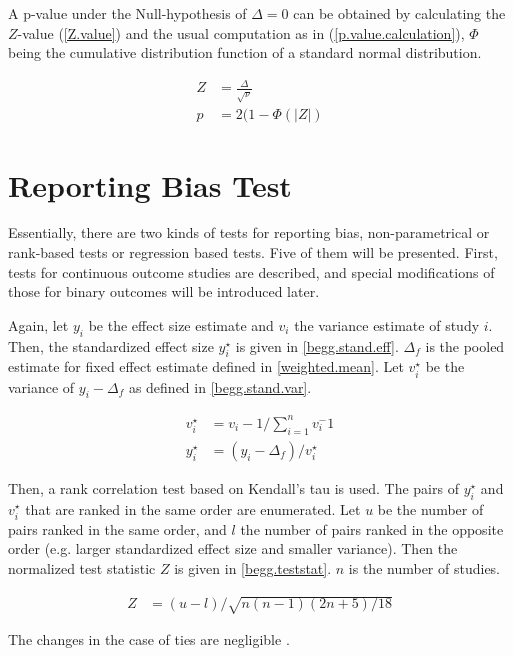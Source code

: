\documentclass[11pt,a4paper,twoside]{book}\usepackage[]{graphicx}\usepackage[]{color}
\begin{document}
A p-value under the Null-hypothesis of $\Delta = 0$ can be obtained by calculating the $Z$-value (\ref{Z.value}) and the usual computation as in (\ref{p.value.calculation}), $\Phi$ being the cumulative distribution function of a standard normal distribution. 

\begin{align}
Z &= \frac{\Delta}{\sqrt{\nu}} \label{Z-value} \\
p &= 2(1 - \Phi(|{Z}|) \label{p.value.calculation}
\end{align}

\section{Reporting Bias Test}
Essentially, there are two kinds of tests for reporting bias, non-parametrical or rank-based tests or regression based tests. Five of them will be presented.
First, tests for continuous outcome studies are described, and special modifications of those for binary outcomes will be introduced later.

\vspace{0mm}
Again, let $y_{i}$ be the effect size estimate and $v_{i}$ the variance estimate of study $i$. Then, the standardized effect size $y_{i}^\star$ is given in \ref{begg.stand.eff}. $\Delta_{f}$ is the pooled estimate for fixed effect estimate defined in \ref{weighted.mean}. Let $v_{i}^\star$ be the variance of $y_{i} - \Delta_{f}$ as defined in \ref{begg.stand.var}. 

\begin{align}
v_{i}^\star &= v_{i} - 1/\sum_{i = 1}^n v_{i}^-1 \label{begg.stand.var} \\
y_{i}^\star &= (y_{i} - \Delta_{f})/v_{i}^\star \label{begg.stand.eff}
\end{align}

Then, a rank correlation test based on Kendall's tau is used. The pairs of $y_{i}^\star$ and $v_{i}^\star$ that are ranked in the same order are enumerated. Let $u$ be the number of pairs ranked in the same order, and $l$ the number of pairs ranked in the opposite order (e.g. larger standardized effect size and smaller variance). Then the normalized test statistic $Z$ is given in \ref{begg.teststat}. $n$ is the number of studies.

\begin{align}
Z &= (u - l)/\sqrt{n(n-1)(2n + 5)/18} \label{begg.teststat}
\end{align}

The changes in the case of ties are negligible \cite[410]{begg.ties}.
\end{document}
